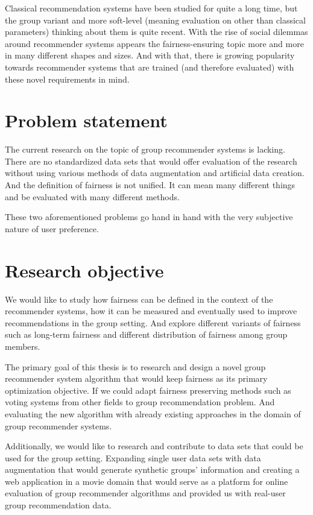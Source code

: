 Classical recommendation systems have been studied for quite a long time, but the group variant and more soft-level (meaning evaluation on other than classical parameters) thinking about them is quite recent. With the rise of social dilemmas around recommender systems appears the fairness-ensuring topic more and more in many different shapes and sizes. And with that, there is growing popularity towards recommender systems that are trained (and therefore evaluated) with these novel requirements in mind.




\section{Problem statement}
The current research on the topic of group recommender systems is lacking. There are no standardized data sets that would offer evaluation of the research without using various methods of data augmentation and artificial data creation.
And the definition of fairness is not unified. It can mean many different things and be evaluated with many different methods.

These two aforementioned problems go hand in hand with the very subjective nature of user preference.

\section{Research objective}

We would like to study how fairness can be defined in the context of the recommender systems, how it can be measured and eventually used to improve recommendations in the group setting. And explore different variants of fairness such as long-term fairness and different distribution of fairness among group members. 

The primary goal of this thesis is to research and design a novel group recommender system algorithm that would keep fairness as its primary optimization objective. If we could adapt fairness preserving methods such as voting systems from other fields to group recommendation problem. And evaluating the new algorithm with already existing approaches in the domain of group recommender systems.

Additionally, we would like to research and contribute to data sets that could be used for the group setting. Expanding single user data sets with data augmentation that would generate synthetic groups' information and creating a web application in a movie domain that would serve as a platform for online evaluation of group recommender algorithms and provided us with real-user group recommendation data.


